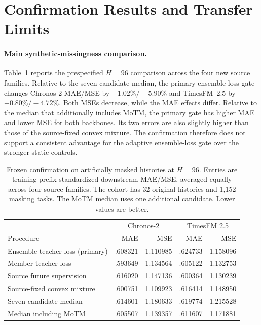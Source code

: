 \section{Confirmation Results and Transfer Limits}
\label{sec:r6_results}

\paragraph{Main synthetic-missingness comparison.}
Table~\ref{tab:r6_main} reports the prespecified $H=96$ comparison across the four new source families. Relative to the seven-candidate median, the primary ensemble-loss gate changes Chronos-2 MAE/MSE by $-1.02\%/-5.90\%$ and TimesFM~2.5 by $+0.80\%/-4.72\%$. Both MSEs decrease, while the MAE effects differ. Relative to the median that additionally includes MoTM, the primary gate has higher MAE and lower MSE for both backbones. Its two errors are also slightly higher than those of the source-fixed convex mixture. The confirmation therefore does not support a consistent advantage for the adaptive ensemble-loss gate over the stronger static controls.

\begin{table}[t]
\caption{Frozen confirmation on artificially masked histories at $H=96$. Entries are training-prefix-standardized downstream MAE/MSE, averaged equally across four source families. The cohort has 32 original histories and 1,152 masking tasks. The MoTM median uses one additional candidate. Lower values are better.}
\label{tab:r6_main}
\centering\small
\begin{tabular}{lrrrr}
\toprule
 & \multicolumn{2}{c}{Chronos-2} & \multicolumn{2}{c}{TimesFM 2.5} \\
Procedure & MAE & MSE & MAE & MSE \\
\midrule
Ensemble teacher loss (primary) & .608321 & 1.110985 & .624733 & 1.158096 \\
Member teacher loss & .593649 & 1.134564 & .605122 & 1.132753 \\
Source future supervision & .616020 & 1.147136 & .600364 & 1.130239 \\
Source-fixed convex mixture & .600751 & 1.109923 & .616414 & 1.148950 \\
Seven-candidate median & .614601 & 1.180633 & .619774 & 1.215528 \\
Median including MoTM & .605507 & 1.139357 & .611607 & 1.171881 \\
\bottomrule
\end{tabular}
\end{table}

